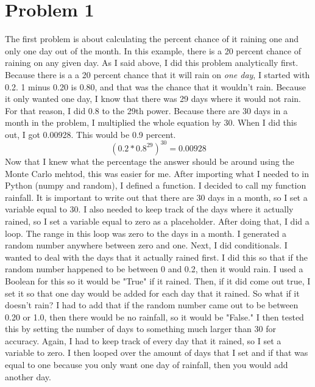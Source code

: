 \documentclass[twocolumn]{revtex4}
\begin{document}
\section{Problem 1}
The first problem is about calculating the percent chance of it raining one and only one day out of the month. In this example, there is a 20 percent chance of raining on any given day. As I said above, I did this problem analytically first. Because there is a a 20 percent chance that it will rain on \textit{one day}, I started with 0.2. 1 minus 0.20 is 0.80, and that was the chance that it wouldn't rain. Because it only wanted one day, I know that there was 29 days where it would not rain. For that reason, I did 0.8 to the 29th power. Because there are 30 days in a month in the problem, I multiplied the whole equation by 30. When I did this out, I got 0.00928. This would be 0.9 percent.
$$ (0.2*0.8^{29})^{30} = 0.00928$$
 Now that I knew what the percentage the answer should be around using the Monte Carlo mehtod, this was easier for me. After importing what I needed to in Python (numpy and random), I defined a function. I decided to call my function rainfall. It is important to write out that there are 30 days in a month, so I set a variable equal to 30. I also needed to keep track of the days where it actually rained, so I set a variable equal to zero as a placeholder. After doing that, I did a loop. The range in this loop was zero to the days in a month. I generated a random number anywhere between zero and one. Next, I did conditionals. I wanted to deal with the days that it actually rained first. I did this so that if the random number happened to be between 0 and 0.2, then it would rain. I used a Boolean for this so it would be "True" if it rained. Then, if it did come out true, I set it so that one day would be added for each day that it rained. So what if it doesn't rain? I had to add that if the random number came out to be between 0.20 or 1.0, then there would be no rainfall, so it would be "False." I then tested this by setting the number of days to something much larger than 30 for accuracy. Again, I had to keep track of every day that it rained, so I set a variable to zero.  I then looped over the amount of days that I set and if that was equal to one because you only want one day of rainfall, then you would add another day.  
\end{document}
